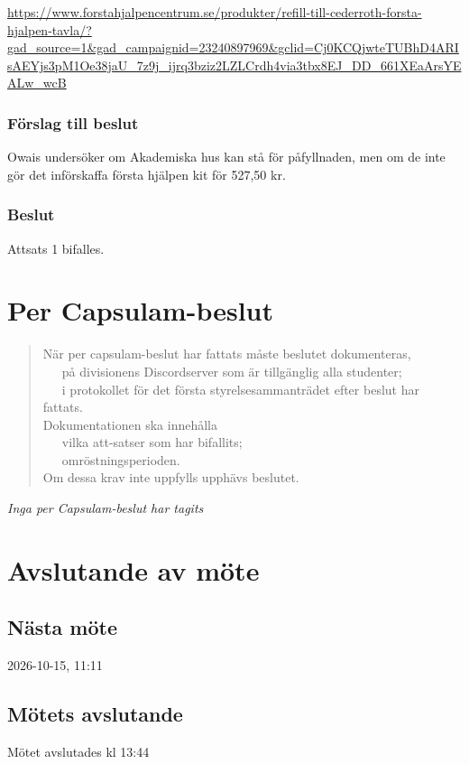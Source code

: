 \documentclass[protokoll]{dvd}
\begin{document}
\url{https://www.forstahjalpencentrum.se/produkter/refill-till-cederroth-forsta-hjalpen-tavla/?gad_source=1&gad_campaignid=23240897969&gclid=Cj0KCQjwteTUBhD4ARIsAEYjs3pM1Oe38jaU_7z9j_ijrq3bziz2LZLCrdh4via3tbx8EJ_DD_661XEaArsYEALw_wcB}

\subsubsection*{Förslag till beslut}
\begin{attsatser}
    \item Owais undersöker om Akademiska hus kan stå för påfyllnaden, men om de inte gör det införskaffa första hjälpen kit för 527,50 kr. 
\end{attsatser}
\subsubsection*{Beslut}
\begin{attsatser}
    \item Attsats 1 bifalles.
\end{attsatser}

\newpage
\section{Per Capsulam-beslut}
\blockquote[]{
När per capsulam-beslut har fattats måste beslutet dokumenteras,\\
\ \cdot\ \ på divisionens Discordserver som är tillgänglig alla studenter;\\
\ \cdot\ \ i protokollet för det första styrelsesammanträdet efter beslut har fattats.\\

Dokumentationen ska innehålla\\
\ \cdot\ \ vilka att-satser som har bifallits;\\
\ \cdot\ \ omröstningsperioden.\\

Om dessa krav inte uppfylls upphävs beslutet.
}
\textit{Inga per Capsulam-beslut har tagits}

\section{Avslutande av möte}

\subsection{Nästa möte}
2026-10-15, 11:11

\subsection{Mötets avslutande}
Mötet avslutades kl 13:44 

\styrelsesignaturer
\end{document}
